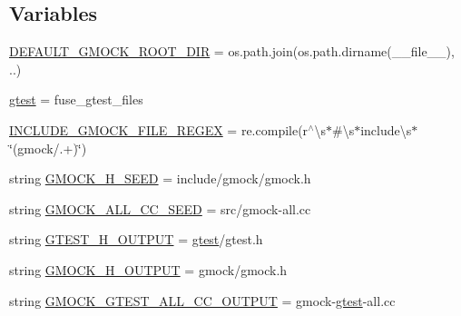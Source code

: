 \subsection*{Variables}
\begin{DoxyCompactItemize}
\item 
\mbox{\hyperlink{namespacefuse__gmock__files_a900b64b34e20c7430b72252192a3c7ed}{D\+E\+F\+A\+U\+L\+T\+\_\+\+G\+M\+O\+C\+K\+\_\+\+R\+O\+O\+T\+\_\+\+D\+IR}} = os.\+path.\+join(os.\+path.\+dirname(\+\_\+\+\_\+file\+\_\+\+\_\+), \textquotesingle{}..\textquotesingle{})
\item 
\mbox{\hyperlink{namespacefuse__gmock__files_a3fb36dbe8d361f9ecc54e1aa4b94b068}{gtest}} = fuse\+\_\+gtest\+\_\+files
\item 
\mbox{\hyperlink{namespacefuse__gmock__files_aeb4457451f878d6bc8a42f7ff3e5f6cf}{I\+N\+C\+L\+U\+D\+E\+\_\+\+G\+M\+O\+C\+K\+\_\+\+F\+I\+L\+E\+\_\+\+R\+E\+G\+EX}} = re.\+compile(r\textquotesingle{}$^\wedge$\textbackslash{}s$\ast$\#\textbackslash{}s$\ast$include\textbackslash{}s$\ast$\char`\"{}(gmock/.+)\char`\"{}\textquotesingle{})
\item 
string \mbox{\hyperlink{namespacefuse__gmock__files_aa31b816a9048fb3fa9d482eeac69c139}{G\+M\+O\+C\+K\+\_\+\+H\+\_\+\+S\+E\+ED}} = \textquotesingle{}include/gmock/gmock.\+h\textquotesingle{}
\item 
string \mbox{\hyperlink{namespacefuse__gmock__files_a518e1f3cc3f184747e6ed3f2d0233c99}{G\+M\+O\+C\+K\+\_\+\+A\+L\+L\+\_\+\+C\+C\+\_\+\+S\+E\+ED}} = \textquotesingle{}src/gmock-\/all.\+cc\textquotesingle{}
\item 
string \mbox{\hyperlink{namespacefuse__gmock__files_a385c31d8542b0a2e4b7f46cb2a32d7da}{G\+T\+E\+S\+T\+\_\+\+H\+\_\+\+O\+U\+T\+P\+UT}} = \textquotesingle{}\mbox{\hyperlink{namespacefuse__gmock__files_a3fb36dbe8d361f9ecc54e1aa4b94b068}{gtest}}/gtest.\+h\textquotesingle{}
\item 
string \mbox{\hyperlink{namespacefuse__gmock__files_aba0664abeb60f34cfdf59e8475a465d0}{G\+M\+O\+C\+K\+\_\+\+H\+\_\+\+O\+U\+T\+P\+UT}} = \textquotesingle{}gmock/gmock.\+h\textquotesingle{}
\item 
string \mbox{\hyperlink{namespacefuse__gmock__files_a9759f3f6c404e3292c26c9317792e846}{G\+M\+O\+C\+K\+\_\+\+G\+T\+E\+S\+T\+\_\+\+A\+L\+L\+\_\+\+C\+C\+\_\+\+O\+U\+T\+P\+UT}} = \textquotesingle{}gmock-\/\mbox{\hyperlink{namespacefuse__gmock__files_a3fb36dbe8d361f9ecc54e1aa4b94b068}{gtest}}-\/all.\+cc\textquotesingle{}
\end{DoxyCompactItemize}


